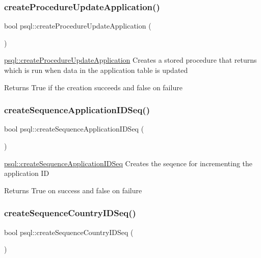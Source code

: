 \subsubsection{\texorpdfstring{create\+Procedure\+Update\+Application()}{createProcedureUpdateApplication()}}
{\footnotesize\ttfamily bool psql\+::create\+Procedure\+Update\+Application (\begin{DoxyParamCaption}{ }\end{DoxyParamCaption})}



\mbox{\hyperlink{classpsql_a28f3e3d6309e3ce57493db284c099946}{psql\+::create\+Procedure\+Update\+Application}} Creates a stored procedure that returns which is run when data in the application table is updated 

\begin{DoxyReturn}{Returns}
True if the creation succeeds and false on failure 
\end{DoxyReturn}
\mbox{\label{classpsql_a54c75d0896ee6aad58e22c830895c106}} 
\subsubsection{\texorpdfstring{create\+Sequence\+Application\+I\+D\+Seq()}{createSequenceApplicationIDSeq()}}
{\footnotesize\ttfamily bool psql\+::create\+Sequence\+Application\+I\+D\+Seq (\begin{DoxyParamCaption}{ }\end{DoxyParamCaption})}



\mbox{\hyperlink{classpsql_a54c75d0896ee6aad58e22c830895c106}{psql\+::create\+Sequence\+Application\+I\+D\+Seq}} Creates the seqence for incrementing the application ID 

\begin{DoxyReturn}{Returns}
True on success and false on failure 
\end{DoxyReturn}
\mbox{\label{classpsql_aa907c84f592212451d3d59a2061adabd}} 
\subsubsection{\texorpdfstring{create\+Sequence\+Country\+I\+D\+Seq()}{createSequenceCountryIDSeq()}}
{\footnotesize\ttfamily bool psql\+::create\+Sequence\+Country\+I\+D\+Seq (\begin{DoxyParamCaption}{ }\end{DoxyParamCaption})}



